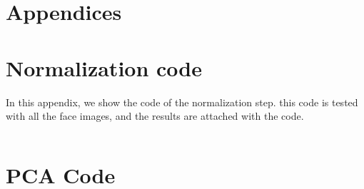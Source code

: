 \documentclass[12pt]{article} %
\begin{document}
\appendix
{}
\section*{Appendices}
\section{Normalization code}

In this appendix, we show the code of the normalization step. this code is tested with all the face images, and the results are attached with the code. 

\begin{lstlisting}	

\end{lstlisting}

\section{PCA Code}




 

\end{document}
